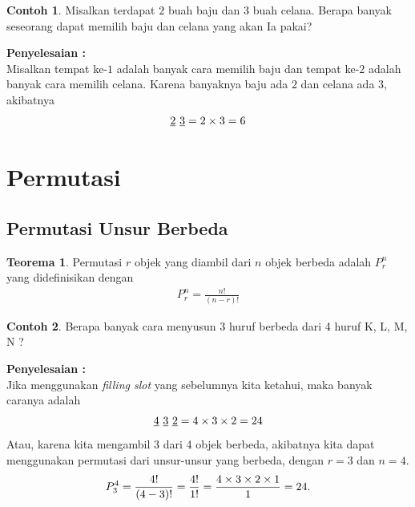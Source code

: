 \documentclass[aspectratio=169]{beamer}
\theoremstyle{definition}
\newtheorem{teorema}{Teorema}
\newtheorem{contoh}{Contoh}
\begin{document}
\begin{frame}{\insertsection}{\insertsection}
  \begin{contoh}
    Misalkan terdapat $2$ buah baju dan $3$ buah celana. Berapa banyak seseorang dapat memilih baju dan celana yang akan Ia pakai?

    \textbf{Penyelesaian : }\\
    Misalkan tempat ke-$1$ adalah banyak cara memilih baju dan tempat ke-$2$ adalah banyak cara memilih celana. Karena banyaknya baju ada $2$ dan celana ada $3$, akibatnya
    \begin{align}
      \uline{2} \ \uline{3}=2 \times 3 = 6 \notag
    \end{align}
  \end{contoh}
\end{frame}

\section{Permutasi}
\subsection{Permutasi Unsur Berbeda}
\begin{frame}{\insertsection}{\insertsubsection}
  \begin{teorema}
    Permutasi $r$ objek yang diambil dari $n$ objek berbeda adalah $P_r^n$ yang didefinisikan dengan
    \begin{align}
      P_r^n = \frac{n!}{(n-r)!}
    \end{align}
  \end{teorema}
\end{frame}

\begin{frame}{\insertsection}{\insertsubsection}
  \begin{contoh}
    Berapa banyak cara menyusun 3 huruf berbeda dari 4 huruf K, L, M, N ?

    \textbf{Penyelesaian : }\\
    Jika menggunakan \textit{filling slot} yang sebelumnya kita ketahui, maka banyak caranya adalah
    \begin{align}
      \uline{4} \ \uline{3} \  \uline{2} = 4 \times 3 \times 2 = 24 \notag
    \end{align}
    Atau, karena kita mengambil 3 dari 4 objek berbeda, akibatnya kita dapat menggunakan permutasi dari unsur-unsur yang berbeda, dengan $r=3$ dan $n=4$.
    \begin{align}
      P_3^4 = \frac{4!}{(4-3)!}=\frac{4!}{1!}=\frac{4 \times 3 \times 2 \times 1}{1}=24. \notag
    \end{align}
  \end{contoh}
\end{frame}
\end{document}
